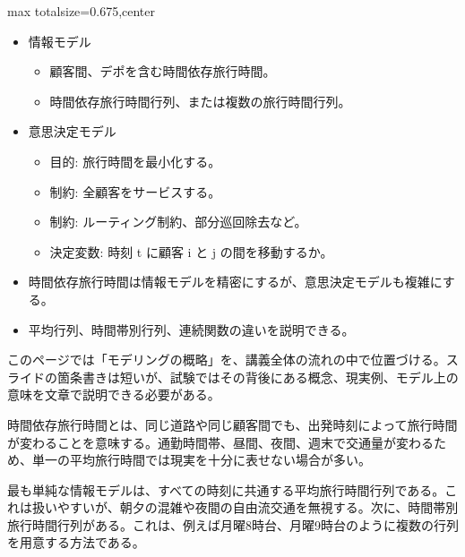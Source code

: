\clearpage
{}
\begin{adjustbox}{max totalsize={\textwidth}{0.675\textheight},center}
\begin{minipage}{\textwidth}\scriptsize
\begin{minipage}[t]{0.485\textwidth}
\begin{itemize}
\item 情報モデル
\begin{itemize}
\item 顧客間、デポを含む時間依存旅行時間。
\item 時間依存旅行時間行列、または複数の旅行時間行列。
\end{itemize}
\item 意思決定モデル
\begin{itemize}
\item 目的: 旅行時間を最小化する。
\item 制約: 全顧客をサービスする。
\item 制約: ルーティング制約、部分巡回除去など。
\item 決定変数: 時刻 t に顧客 i と j の間を移動するか。
\end{itemize}
\end{itemize}
\begin{itemize}
\item 時間依存旅行時間は情報モデルを精密にするが、意思決定モデルも複雑にする。
\item 平均行列、時間帯別行列、連続関数の違いを説明できる。
\end{itemize}
\end{minipage}\hfill
\begin{minipage}[t]{0.485\textwidth}
このページでは「モデリングの概略」を、講義全体の流れの中で位置づける。スライドの箇条書きは短いが、試験ではその背後にある概念、現実例、モデル上の意味を文章で説明できる必要がある。\par
時間依存旅行時間とは、同じ道路や同じ顧客間でも、出発時刻によって旅行時間が変わることを意味する。通勤時間帯、昼間、夜間、週末で交通量が変わるため、単一の平均旅行時間では現実を十分に表せない場合が多い。\par
最も単純な情報モデルは、すべての時刻に共通する平均旅行時間行列である。これは扱いやすいが、朝夕の混雑や夜間の自由流交通を無視する。次に、時間帯別旅行時間行列がある。これは、例えば月曜8時台、月曜9時台のように複数の行列を用意する方法である。\par

\end{minipage}
\end{minipage}
\end{adjustbox}
